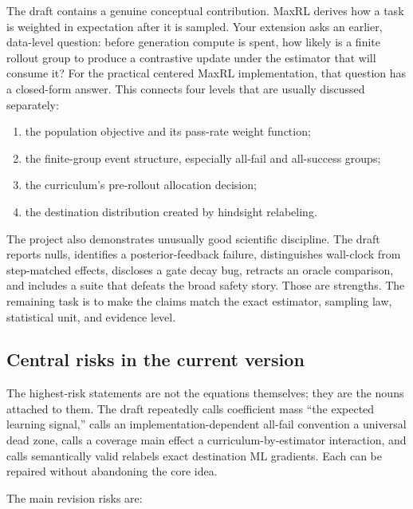 \documentclass[11pt]{article}
\theoremstyle{definition}
\theoremstyle{remark}
\begin{document}
The draft contains a genuine conceptual contribution. MaxRL derives how a task is weighted in expectation after it is sampled. Your extension asks an earlier, data-level question: before generation compute is spent, how likely is a finite rollout group to produce a contrastive update under the estimator that will consume it? For the practical centered MaxRL implementation, that question has a closed-form answer. This connects four levels that are usually discussed separately:

\begin{enumerate}[leftmargin=2em]
\item the population objective and its pass-rate weight function;
\item the finite-group event structure, especially all-fail and all-success groups;
\item the curriculum's pre-rollout allocation decision;
\item the destination distribution created by hindsight relabeling.
\end{enumerate}

The project also demonstrates unusually good scientific discipline. The draft reports nulls, identifies a posterior-feedback failure, distinguishes wall-clock from step-matched effects, discloses a gate decay bug, retracts an oracle comparison, and includes a suite that defeats the broad safety story. Those are strengths. The remaining task is to make the claims match the exact estimator, sampling law, statistical unit, and evidence level.

\subsection{Central risks in the current version}

\begin{prioritybox}
The highest-risk statements are not the equations themselves; they are the nouns attached to them. The draft repeatedly calls coefficient mass ``the expected learning signal,'' calls an implementation-dependent all-fail convention a universal dead zone, calls a coverage main effect a curriculum-by-estimator interaction, and calls semantically valid relabels exact destination ML gradients. Each can be repaired without abandoning the core idea.
\end{prioritybox}

The main revision risks are:
\end{document}
